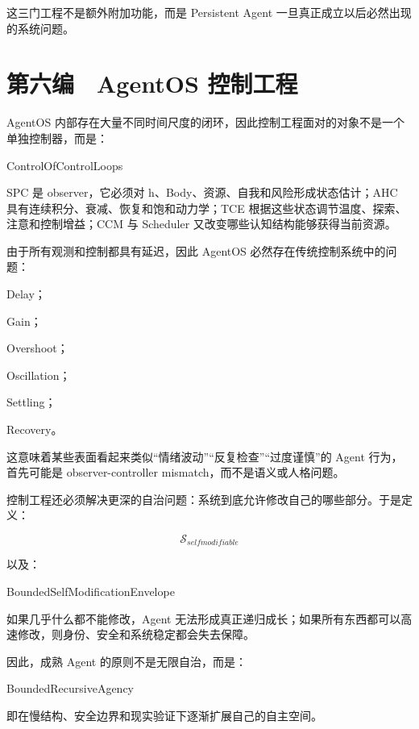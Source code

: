这三门工程不是额外附加功能，而是 Persistent Agent 一旦真正成立以后必然出现的系统问题。




\part{第六编　AgentOS 控制工程}
AgentOS 内部存在大量不同时间尺度的闭环，因此控制工程面对的对象不是一个单独控制器，而是：

\begin{statementbox}
ControlOfControlLoops
\end{statementbox}

SPC 是 observer，它必须对 h、Body、资源、自我和风险形成状态估计；AHC 具有连续积分、衰减、恢复和饱和动力学；TCE 根据这些状态调节温度、探索、注意和控制增益；CCM 与 Scheduler 又改变哪些认知结构能够获得当前资源。

由于所有观测和控制都具有延迟，因此 AgentOS 必然存在传统控制系统中的问题：

Delay；

Gain；

Overshoot；

Oscillation；

Settling；

Recovery。

这意味着某些表面看起来类似“情绪波动”“反复检查”“过度谨慎”的 Agent 行为，首先可能是 observer-controller mismatch，而不是语义或人格问题。

控制工程还必须解决更深的自治问题：系统到底允许修改自己的哪些部分。于是定义：

$$
\mathcal S_{selfmodifiable}
$$

以及：

\begin{statementbox}
BoundedSelfModificationEnvelope
\end{statementbox}

如果几乎什么都不能修改，Agent 无法形成真正递归成长；如果所有东西都可以高速修改，则身份、安全和系统稳定都会失去保障。

因此，成熟 Agent 的原则不是无限自治，而是：

\begin{statementbox}
BoundedRecursiveAgency
\end{statementbox}

即在慢结构、安全边界和现实验证下逐渐扩展自己的自主空间。









